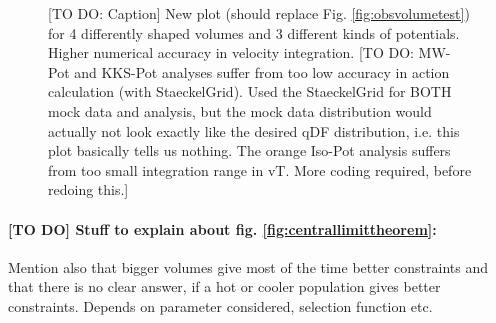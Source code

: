 \begin{figure}
\caption{[TO DO: Caption] New plot (should replace Fig. \ref{fig:obsvolumetest}) for 4 differently shaped volumes and 3 different kinds of potentials. Higher numerical accuracy in velocity integration. [TO DO: MW-Pot and KKS-Pot analyses suffer from too low accuracy in action calculation (with StaeckelGrid). Used the StaeckelGrid for BOTH mock data and analysis, but the mock data distribution would actually not look exactly like the desired qDF distribution, i.e. this plot basically tells us nothing. The orange Iso-Pot analysis suffers from too small integration range in vT. More coding required, before redoing this.]}
\end{figure}

 \paragraph{[TO DO] Stuff to explain about fig. \ref{fig:centrallimittheorem}:} Mention also that bigger volumes give most of the time better constraints and that there is no clear answer, if a hot or cooler population gives better constraints. Depends on parameter considered, selection function etc.



